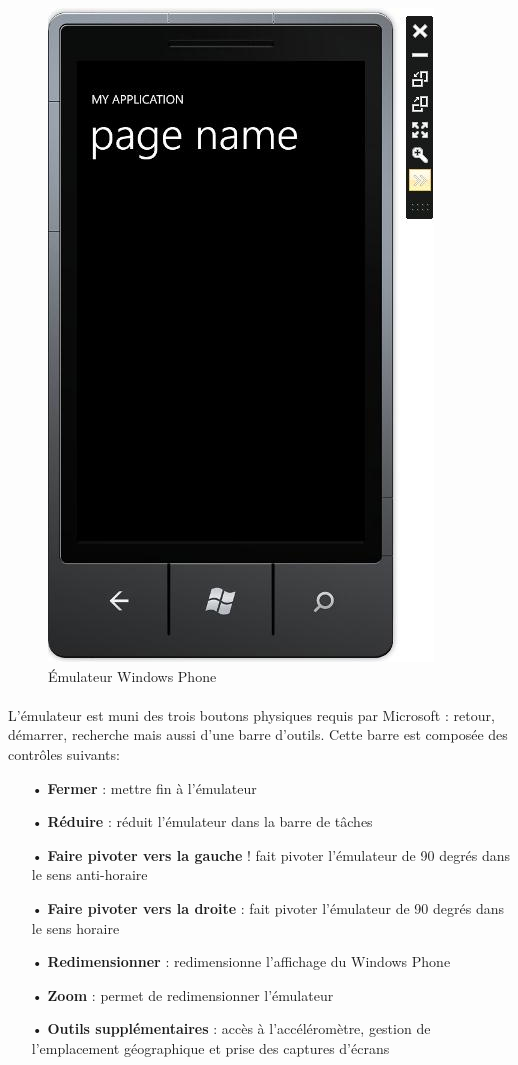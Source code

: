 \documentclass[twoside,UTF8]{EPURapport}
\begin{document}
\begin{figure}[H]
\center
\includegraphics[scale=0.6]{images/emulateur.jpg}
\caption{\'Emulateur Windows Phone}
\end{figure}

\paragraph{}
L'émulateur est muni des trois boutons physiques requis par Microsoft : retour, démarrer, recherche mais aussi d'une barre d'outils. Cette barre est composée des contrôles suivants: 
\begin{itemize}
	\item[•]\textbf{Fermer} : mettre fin à l'émulateur
	\item[•]\textbf{Réduire} : réduit l'émulateur dans la barre de tâches
	\item[•]\textbf{Faire pivoter vers la gauche} ! fait pivoter l'émulateur de 90 degrés dans le sens anti-horaire
	\item[•]\textbf{Faire pivoter vers la droite} : fait pivoter l'émulateur de 90 degrés dans le sens horaire
	\item[•]\textbf{Redimensionner} : redimensionne l'affichage du Windows Phone
	\item[•]\textbf{Zoom} : permet de redimensionner l'émulateur
	\item[•]\textbf{Outils supplémentaires} : accès à l'accéléromètre, gestion de l'emplacement géographique et prise des captures d'écrans
\end{itemize}
\end{document}
